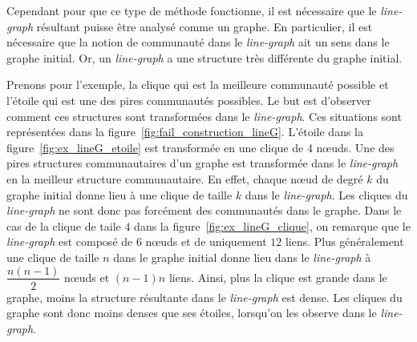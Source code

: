 Cependant pour que ce type de méthode fonctionne, il est nécessaire que le \emph{line-graph} résultant puisse être analysé comme un graphe.
En particulier, il est nécessaire que la notion de communauté dans le \emph{line-graph} ait un sens dans le graphe initial.
Or, un \emph{line-graph} a une structure très différente du graphe initial.


Prenons pour l'exemple, la clique qui est la meilleure communauté possible et l'étoile qui est une des pires communautés possibles.
Le but est d'observer comment ces structures sont transformées dans le \emph{line-graph}.
Ces situations sont représentées dans la figure~\ref{fig:fail_construction_lineG}.
L'étoile dans la figure~\ref{fig:ex_lineG_etoile} est transformée en une clique de 4 n\oe uds.
Une des pires structures communautaires d'un graphe est transformée dans le \emph{line-graph} en la meilleur structure communautaire.
En effet, chaque n\oe ud de degré $k$ du graphe initial donne lieu à une clique de taille $k$ dans le \emph{line-graph}.
Les cliques du \emph{line-graph} ne sont donc pas forcément des communautés dans le graphe.
Dans le cas de la clique de taile $4$ dans la figure~\ref{fig:ex_lineG_clique}, on remarque que le \emph{line-graph} est composé de $6$ n\oe uds et de uniquement $12$ liens.
Plus généralement une clique de taille $n$ dans le graphe initial donne lieu dans le \emph{line-graph} à $\dfrac{n(n-1)}{2}$ n\oe uds et $(n-1)n$ liens.
Ainsi, plus la clique est grande dans le graphe, moins la structure résultante dans le \emph{line-graph} est dense.
Les cliques du graphe sont donc moins denses que ses étoiles, lorsqu'on les observe dans le \emph{line-graph}.

